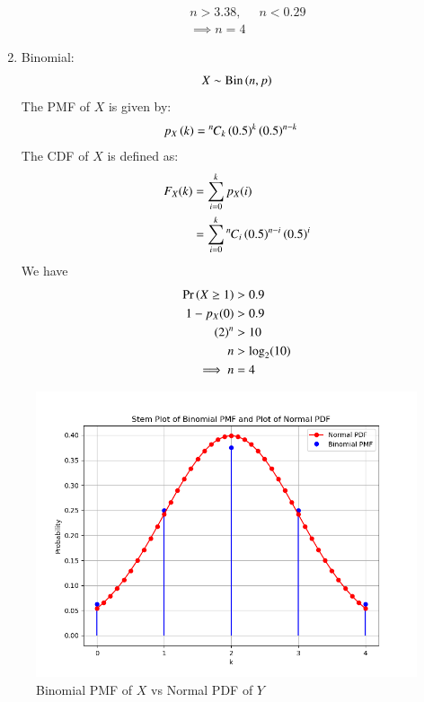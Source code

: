 \documentclass[journal,12pt,twocolumn]{IEEEtran}
\theoremstyle{remark}
\begin{document}
\begin{enumerate}
\begin{enumerate}
\begin{align}
	n > 3.38, &\; n < 0.29\\
	\implies n = 4
\end{align}
\end{enumerate}
\item Binomial:
\begin{align}
	X \sim \mathrm{Bin}\left(n, p\right)
\end{align} 
The PMF of $X$ is given by:
\begin{align}
p_X\left(k\right) &= {{}^{n}\mkern-1muC_{k}}\left(0.5\right)^k\left(0.5\right)^{n-k}
\end{align} 
The CDF of $X$ is defined as:
\begin{align}
F_X(k) &= \sum_{i=0}^{k}p_X(i)\\
&= \sum_{i=0}^{k}{{}^{n}\mkern-1muC_{i}}\left(0.5\right)^{n-i}\left(0.5\right)^i
\end{align}
We have
\begin{align}
\Pr\left(X\geq 1\right) &> 0.9 \\
1 - p_{X}(0) &> 0.9\\
\left(2\right)^n &> 10\\
n&>\log_2(10)\\
\implies n &= 4
\end{align}
\end{enumerate}
\newpage
\begin{figure}
\includegraphics[width=\columnwidth]{./figs/main.png}
\caption{Binomial PMF of $X$ vs Normal PDF of $Y$}
\label{fig:gaussian_Y vs binomial_Y}
\end{figure}
\end{document}
